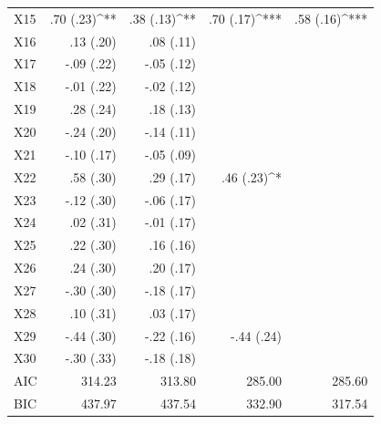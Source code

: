 \documentclass[11pt,oneside,a4paper]{article}
\begin{document}
\begin{table}
\begin{center}
\begin{tabular}{l D{)}{)}{9)3}@{} D{)}{)}{9)3}@{} D{)}{)}{9)3}@{} D{)}{)}{9)3}@{} }
X15            & .70 \; (.23)^{**}   & .38 \; (.13)^{**}  & .70 \; (.17)^{***}  & .58 \; (.16)^{***}  \\
X16            & .13 \; (.20)        & .08 \; (.11)       &                     &                     \\
X17            & -.09 \; (.22)       & -.05 \; (.12)      &                     &                     \\
X18            & -.01 \; (.22)       & -.02 \; (.12)      &                     &                     \\
X19            & .28 \; (.24)        & .18 \; (.13)       &                     &                     \\
X20            & -.24 \; (.20)       & -.14 \; (.11)      &                     &                     \\
X21            & -.10 \; (.17)       & -.05 \; (.09)      &                     &                     \\
X22            & .58 \; (.30)        & .29 \; (.17)       & .46 \; (.23)^{*}    &                     \\
X23            & -.12 \; (.30)       & -.06 \; (.17)      &                     &                     \\
X24            & .02 \; (.31)        & -.01 \; (.17)      &                     &                     \\
X25            & .22 \; (.30)        & .16 \; (.16)       &                     &                     \\
X26            & .24 \; (.30)        & .20 \; (.17)       &                     &                     \\
X27            & -.30 \; (.30)       & -.18 \; (.17)      &                     &                     \\
X28            & .10 \; (.31)        & .03 \; (.17)       &                     &                     \\
X29            & -.44 \; (.30)       & -.22 \; (.16)      & -.44 \; (.24)       &                     \\
X30            & -.30 \; (.33)       & -.18 \; (.18)      &                     &                     \\
\midrule
AIC            & 314.23              & 313.80             & 285.00              & 285.60              \\
BIC            & 437.97              & 437.54             & 332.90              & 317.54              \\

\end{tabular}
\end{center}
\end{table}
\end{document}
